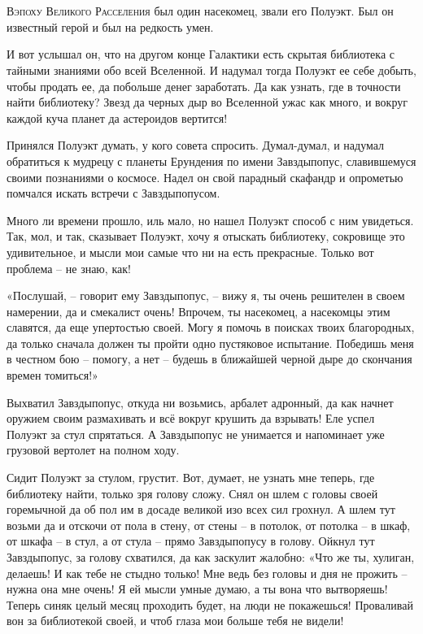 \documentclass[ebook,oneside,final,openright]{memoir}
\begin{document}
\chapter{}
 \lettrine{В}{эпоху Великого Расселения} был один насекомец, звали его Полуэкт. Был он известный герой и был на редкость умен.\par
\par
И вот услышал он, что на другом конце Галактики есть скрытая библиотека с тайными знаниями обо всей Вселенной. И надумал тогда Полуэкт ее себе добыть, чтобы продать ее, да побольше денег заработать. Да как узнать, где в точности найти библиотеку? Звезд да черных дыр во Вселенной ужас как много, и вокруг каждой куча планет да астероидов вертится!\par
\par
Принялся Полуэкт думать, у кого совета спросить. Думал-думал, и надумал обратиться к мудрецу с планеты Ерундения по имени Завздыпопус, славившемуся своими познаниями о космосе. Надел он свой парадный скафандр и опрометью помчался искать встречи с Завздыпопусом.\par
\par
Много ли времени прошло, иль мало, но нашел Полуэкт способ с ним увидеться. Так, мол, и так, сказывает Полуэкт, хочу я отыскать библиотеку, сокровище это удивительное, и мысли мои самые что ни на есть прекрасные. Только вот проблема – не знаю, как!\par
\par
«Послушай, – говорит ему Завздыпопус, – вижу я, ты очень решителен в своем намерении, да и смекалист очень! Впрочем, ты насекомец, а насекомцы этим славятся, да еще упертостью своей. Могу я помочь в поисках твоих благородных, да только сначала должен ты пройти одно пустяковое испытание. Победишь меня в честном бою – помогу, а нет – будешь в ближайшей черной дыре до скончания времен томиться!» \par
\par
Выхватил Завздыпопус, откуда ни возьмись, арбалет адронный, да как начнет оружием своим размахивать и всё вокруг крушить да взрывать! Еле успел Полуэкт за стул спрятаться. А Завздыпопус не унимается и напоминает уже грузовой вертолет на полном ходу. \par
\par
Сидит Полуэкт за стулом, грустит. Вот, думает, не узнать мне теперь, где библиотеку найти, только зря голову сложу. Снял он шлем с головы своей горемычной да об пол им в досаде великой изо всех сил грохнул. А шлем тут возьми да и отскочи от пола в стену, от стены – в потолок, от потолка – в шкаф, от шкафа – в стул, а от стула – прямо Завздыпопусу в голову. Ойкнул тут Завздыпопус, за голову схватился, да как заскулит жалобно: «Что же ты, хулиган, делаешь! И как тебе не стыдно только! Мне ведь без головы и дня не прожить – нужна она мне очень! Я ей мысли умные думаю, а ты вона что вытворяешь! Теперь синяк целый месяц проходить будет, на люди не покажешься! Проваливай вон за библиотекой своей, и чтоб глаза мои больше тебя не видели!\par
\end{document}
